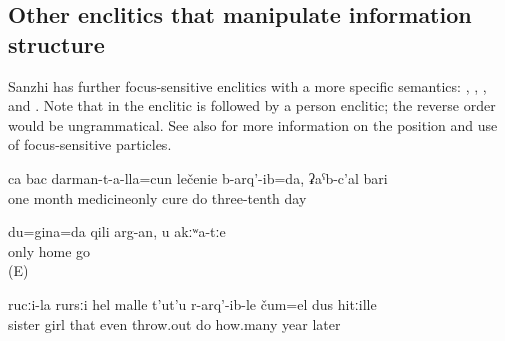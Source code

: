 
\subsection{Other enclitics that manipulate information structure}
\label{ssec:Further enclitics that manipulate the information structure}

Sanzhi has further focus-sensitive enclitics with a more specific semantics:   ,   ,   , and   . Note that in  the enclitic  is followed by a person enclitic; the reverse order would be ungrammatical. See also  for more information on the position and use of focus-sensitive particles.
%
\begin{exe}
	\ex	\label{ex:‎‎‎For one month I was cured only with pills, for 30 days minor}
	\gll	ca	bac	darman-t-a-lla=cun	lečenie	b-arq'-ib=da,	ʡaˁb-c'al	bari\\
		one	month	medicineonly	cure	do	three-tenth	day\\
	\glt	{}

	\ex	\label{ex:Only I / I alone will go home, not you minor@6}
	\gll	du=gina=da	qili	arg-an,	u	akːʷa-tːe\\
		only	home	go		\\
	\glt	{} (E)

	\ex	\label{ex:‎‎‎Even his sisters daughter did he throw out, after some years minor}
	\gll	rucːi-la	rursːi	hel	malle	t'ut'u	r-arq'-ib-le	čum=el	dus	hitːille\\
		sister	girl	that	even	throw.out	do	how.many	year	later\\
	\glt	{}
\end{exe}

